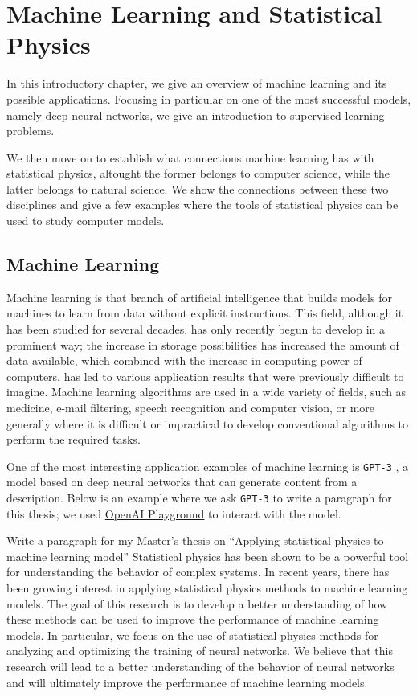 \chapter{Machine Learning and Statistical Physics}
In this introductory chapter, we give an overview of machine learning and its possible applications.
Focusing in particular on one of the most successful models, namely deep neural networks,
we give an introduction to supervised learning problems.

We then move on to establish what connections machine learning has with statistical physics,
altought the former belongs to computer science, while the latter belongs to natural science.
We show the connections between these two disciplines
and give a few examples where the tools of statistical physics can be used to study computer models.

 \section{Machine Learning}
 Machine learning is that branch of artificial intelligence that builds models for machines to learn from data without explicit instructions.
 This field, although it has been studied for several decades, has only recently begun to develop in a prominent way;
 the increase in storage possibilities has increased the amount of data available, which combined with the increase in computing power of computers,
 has led to various application results that were previously difficult to imagine.
 Machine learning algorithms are used in a wide variety of fields, such as medicine, e-mail filtering,
 speech recognition and computer vision, or more generally where it is difficult or impractical to develop conventional algorithms to perform the required tasks.

 One of the most interesting application examples of machine learning is \texttt{GPT-3} \cite{brown2020language},
 a model based on deep neural networks that can generate content from a description.
 Below is an example where we ask \texttt{GPT-3} to write a paragraph for this thesis;
 we used \href{https://beta.openai.com/playground/}{OpenAI Playground} to interact with the model.
\begin{dialogue}
   Write a paragraph for my Master's thesis on ``Applying statistical physics to machine learning model''
   Statistical physics has been shown to be a powerful tool for understanding the behavior of complex systems. In recent years, there has been growing interest in applying statistical physics methods to machine learning models. The goal of this research is to develop a better understanding of how these methods can be used to improve the performance of machine learning models. In particular, we focus on the use of statistical physics methods for analyzing and optimizing the training of neural networks. We believe that this research will lead to a better understanding of the behavior of neural networks and will ultimately improve the performance of machine learning models.
\end{dialogue}

